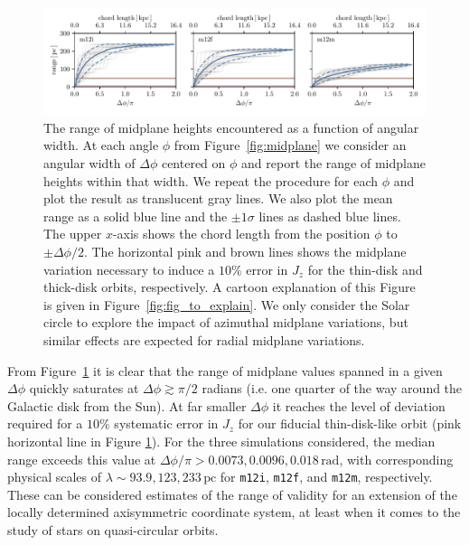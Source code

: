 \documentclass[twocolumn]{aastex62}
\newcommand{\pc}{\text{pc}}
\newcommand{\mi}{\texttt{m12i}}
\newcommand{\mf}{\texttt{m12f}}
\newcommand{\mm}{\texttt{m12m}}
\newcommand{\thincolor}{pink}
\newcommand{\thickcolor}{brown}
\begin{document}
\begin{figure}
\begin{center}
\includegraphics[width=6.8in]{fig/range_dphi.pdf}
\end{center}
\caption{The range of midplane heights encountered as a function of angular
width. At each angle $\phi$ from Figure~\ref{fig:midplane} we consider an
angular width of $\Delta \phi$ centered on $\phi$ and report the range of
midplane heights within that width. We repeat the procedure for each $\phi$
and plot the result as translucent gray lines. We also plot the mean range as
a solid blue line and the $\pm1\sigma$ lines as dashed blue lines. The upper
$x$-axis shows the chord length from the position $\phi$ to $\pm\Delta\phi/2$.
The horizontal \thincolor{} and \thickcolor{} lines shows the midplane
variation necessary to induce a $10\%$ error in $J_z$ for the thin-disk and
thick-disk orbits, respectively. A cartoon explanation of this Figure is given
in Figure~\ref{fig:fig_to_explain}. We only consider the Solar circle to
explore the impact of azimuthal midplane variations, but similar effects are
expected for radial midplane variations.}
\label{fig:range_deltaphi}
\end{figure}

From Figure~\ref{fig:range_deltaphi} it is clear that the range of midplane
values spanned in a given $\Delta \phi$ quickly saturates at $\Delta \phi
\gtrsim \pi/2$ radians (i.e. one quarter of the way around the Galactic disk
from the Sun). At far smaller $\Delta \phi$ it reaches the level of deviation
required for a $10\%$ systematic error in $J_z$ for our fiducial
thin-disk-like orbit (\thincolor{} horizontal line in Figure
\ref{fig:range_deltaphi}). For the three simulations considered, the median
range exceeds this value at $\Delta \phi/\pi > 0.0073, 0.0096,
0.018\,\text{rad}$, with corresponding physical scales of $\lambda \sim 93.9,
123, 233\,\pc$ for \mi{}, \mf{}, and \mm{}, respectively. These can be
considered estimates of the range of validity for an extension of the locally
determined axisymmetric coordinate system, at least when it comes to the study
of stars on quasi-circular orbits.
\end{document}
